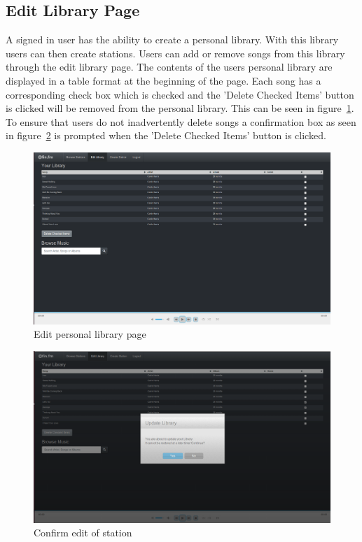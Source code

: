 \documentclass[a4paper, 12pt]{report}
\begin{document}
\subsection{Edit Library Page}
A signed in user has the ability to create a personal library. With this library users can then create stations. Users can add or remove songs from this library through the edit library page. 
The contents of the users personal library are displayed in a table format at the beginning of the page. Each song has a corresponding check box which is checked and the 'Delete Checked Items' button is clicked will be removed from the personal library. This can be seen in figure~\ref{edit-library}. To ensure that users do not inadvertently delete songs a confirmation box as seen in figure~\ref{edit-library-confirm} is prompted when the 'Delete Checked Items' button is clicked.
\begin{figure}[H]
  \centering
    \includegraphics[width=1.0\textwidth]{screenshots/edit-library.png}
    \caption{Edit personal library page}
    \label{edit-library}
\end{figure}
\begin{figure}[H]
  \centering
    \includegraphics[width=1.0\textwidth]{screenshots/edit-library-confirm.png}
    \caption{Confirm edit of station}
    \label{edit-library-confirm}
\end{figure}
\end{document}
